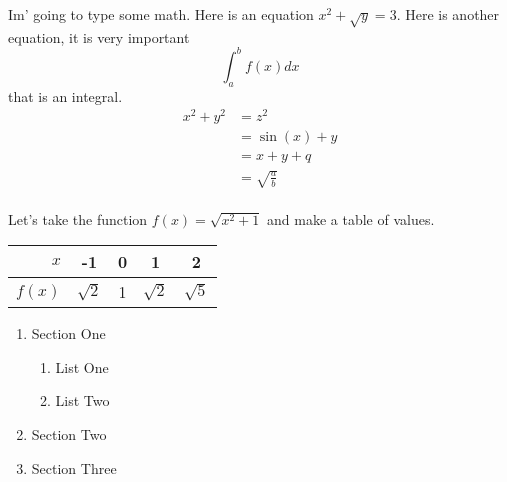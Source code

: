 \documentclass{article}
\begin{document}
Im' going to type some math. Here is an equation $x^2+\sqrt{y}=3$. Here is another equation, it is very important $$\int_{a}^{b}f(x)dx$$ that is an integral.
\begin{align}
x^2+y^2 &= z^2\\
        &= \sin(x) + y \\
        &= x + y + q\\
        &=\sqrt{\frac{a}{b}}
\end{align}\\

Let's take the function $f(x) = \sqrt{x^2+1}$ and make a table of values.
\begin{center}
\begin{tabular}{r|c|c|c|c}

$x$ & -1 & 0 & 1 & 2\\
\hline
$f(x)$ &$\sqrt{2}$ & 1 & $\sqrt{2}$ & $\sqrt{5}$

\end{tabular}
\end{center}


\begin{enumerate}
\item Section One
    \begin{enumerate}
      \item List One
      \item List Two
	   \end{enumerate}
\item Section Two
\item Section Three

\end{enumerate}

\end{document}
